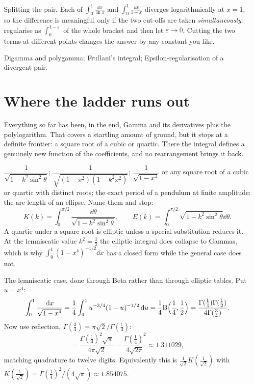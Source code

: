 \begin{trap}
Splitting the pair. Each of $\int_0^1\frac{\dd x}{\ln x}$ and $\int_0^1\frac{\dd x}{1-x}$ diverges logarithmically at $x=1$, so the difference is meaningful only if the two cut-offs are taken \emph{simultaneously}: regularise as $\int_0^{1-\varepsilon}$ of the whole bracket and then let $\varepsilon\to0$. Cutting the two terms at different points changes the answer by any constant you like.
\end{trap}

\begin{seealsob}Digamma and polygamma; Frullani's integral; Epsilon-regularisation of a divergent pair.\end{seealsob}

\section{Where the ladder runs out}

Everything so far has been, in the end, Gamma and its derivatives plus the polylogarithm. That covers a startling amount of ground, but it stops at a definite frontier: a square root of a cubic or quartic. There the integral defines a genuinely new function of the coefficients, and no rearrangement brings it back.

\cue $\dfrac{1}{\sqrt{1-k^{2}\sin^{2}\theta}}$; $\dfrac{1}{\sqrt{(1-x^{2})(1-k^{2}x^{2})}}$; $\dfrac{1}{\sqrt{1-x^{4}}}$ or any square root of a cubic or quartic with distinct roots; the exact period of a pendulum at finite amplitude; the arc length of an ellipse.
\method Name them and stop:
\[K(k)=\int_0^{\pi/2}\frac{\dd\theta}{\sqrt{1-k^{2}\sin^{2}\theta}},\qquad E(k)=\int_0^{\pi/2}\sqrt{1-k^{2}\sin^{2}\theta}\dd\theta.\]
A quartic under a square root is elliptic unless a special substitution reduces it. At the lemniscatic value $k^{2}=\tfrac12$ the elliptic integral does collapse to Gammas, which is why $\int_0^1(1-x^{4})^{-1/2}\dd x$ has a closed form while the general case does not.

\begin{worked}
The lemniscatic case, done through Beta rather than through elliptic tables. Put $u=x^{4}$:
\[\int_0^1\frac{\,\mathrm{d} x}{\sqrt{1-x^{4}}}=\frac14\int_0^1u^{-3/4}(1-u)^{-1/2}\,\mathrm{d} u=\frac14\mathrm{B}\Bigl(\frac14,\frac12\Bigr)=\frac{\Gamma(\tfrac14)\Gamma(\tfrac12)}{4\Gamma(\tfrac34)}.\]
Now use reflection, $\Gamma(\tfrac34)=\pi\sqrt2/\Gamma(\tfrac14)$:
\[=\frac{\Gamma(\tfrac14)^{2}\sqrt\pi}{4\pi\sqrt2}=\frac{\Gamma(\tfrac14)^{2}}{4\sqrt{2\pi}}\approx1.311029,\]
matching quadrature to twelve digits. Equivalently this is $\tfrac{1}{\sqrt2}K(\tfrac{1}{\sqrt2})$ with $K(\tfrac{1}{\sqrt2})=\Gamma(\tfrac14)^{2}/(4\sqrt\pi)\approx1.854075$.
\end{worked}

